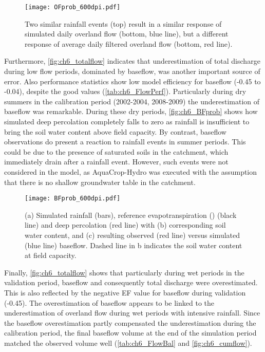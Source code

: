  \begin{figure}[tbhp]
	\centering
		\texttt{[image: OFprob\_600dpi.pdf]}
	\caption{Two similar rainfall events (top) result in a similar response of simulated daily overland flow (bottom, blue line), but a different response of average daily filtered overland flow (bottom, red line). }
	\label{fig:ch6_OFprob}
\end{figure} 

Furthermore, \autoref{fig:ch6_totalflow} indicates that underestimation of total discharge during low flow periods, dominated by baseflow, was another important source of error. Also performance statistics show low model efficiency for baseflow (-0.45 to -0.04), despite the good \Rsq values (\autoref{tab:ch6_FlowPerf}). Particularly during dry summers in the calibration period (2002-2004, 2008-2009) the underestimation of baseflow was remarkable. During these dry periods, \autoref{fig:ch6_BFprob} shows how simulated deep percolation completely falls to zero as rainfall is insufficient to bring the soil water content above field capacity. By contrast, baseflow observations do present a reaction to rainfall events in summer periods. This could be due to the presence of saturated soils in the catchment, which immediately drain after a rainfall event. However, such events were not considered in the model, as AquaCrop-Hydro was executed with the assumption that there is no shallow groundwater table in the catchment.

 \begin{figure}[tbhp]
	\centering
		\texttt{[image: BFprob\_600dpi.pdf]}
	\caption{(a) Simulated rainfall (bars), reference evapotranspiration (\ETo) (black line) and deep percolation (red line) with (b) corresponding soil water content, and (c) resulting observed (red line) versus simulated (blue line) baseflow. Dashed line in b indicates the soil water content at field capacity. }
	\label{fig:ch6_BFprob}
\end{figure}  

Finally, \autoref{fig:ch6_totalflow} shows that particularly during wet periods in the validation period, baseflow and consequently total discharge were overestimated. This is also reflected by the negative EF value for baseflow during validation (-0.45). The overestimation of baseflow appears to be linked to the underestimation of overland flow during wet periods with intensive rainfall. Since the baseflow overestimation partly compensated the underestimation during the calibration period, the final baseflow volume at the end of the simulation period matched the observed volume well (\autoref{tab:ch6_FlowBal} and \autoref{fig:ch6_cumflow}). 

